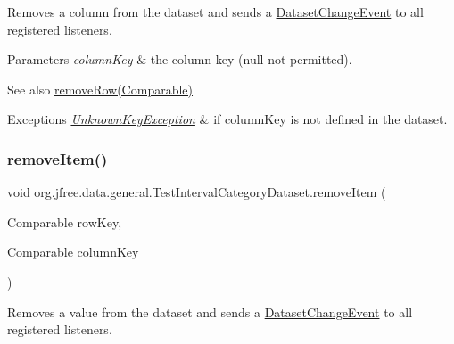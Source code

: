 Removes a column from the dataset and sends a \mbox{\hyperlink{classorg_1_1jfree_1_1data_1_1general_1_1_dataset_change_event}{Dataset\+Change\+Event}} to all registered listeners.


\begin{DoxyParams}{Parameters}
{\em column\+Key} & the column key ({\ttfamily null} not permitted).\\
\hline
\end{DoxyParams}
\begin{DoxySeeAlso}{See also}
\mbox{\hyperlink{classorg_1_1jfree_1_1data_1_1general_1_1_test_interval_category_dataset_a81dd569d6fc2b5520b35012a5bb392f6}{remove\+Row(\+Comparable)}}
\end{DoxySeeAlso}

\begin{DoxyExceptions}{Exceptions}
{\em \mbox{\hyperlink{classorg_1_1jfree_1_1data_1_1_unknown_key_exception}{Unknown\+Key\+Exception}}} & if {\ttfamily column\+Key} is not defined in the dataset. \\
\hline
\end{DoxyExceptions}
\mbox{\label{classorg_1_1jfree_1_1data_1_1general_1_1_test_interval_category_dataset_a5093c08caff886cf2ac4304d291ff2c7}} 
\subsubsection{\texorpdfstring{remove\+Item()}{removeItem()}}
{\footnotesize\ttfamily void org.\+jfree.\+data.\+general.\+Test\+Interval\+Category\+Dataset.\+remove\+Item (\begin{DoxyParamCaption}\item[{Comparable}]{row\+Key,  }\item[{Comparable}]{column\+Key }\end{DoxyParamCaption})}

Removes a value from the dataset and sends a \mbox{\hyperlink{classorg_1_1jfree_1_1data_1_1general_1_1_dataset_change_event}{Dataset\+Change\+Event}} to all registered listeners.



